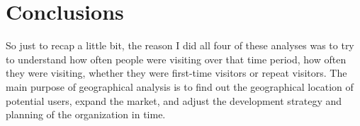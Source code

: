 \documentclass{amsart}
\begin{document}
\section{Conclusions} \label{sec-conclusions}
So just to recap a little bit, the reason I did all four of these analyses was to try to understand how often people were visiting over that time period, how often they were visiting, whether they were first-time visitors or repeat visitors.
The main purpose of geographical analysis is to find out the geographical location of potential users, expand the market, and adjust the development strategy and planning of the organization in time.
\end{document}
